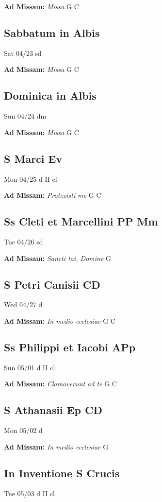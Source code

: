 \documentclass[letterpaper, 10pt, twocolumn]{article}
\begin{document}
\textbf{Ad Missam:} \textit{Missa} G C 

\subsection*{Sabbatum in Albis}Sat 04/23 sd

\textbf{Ad Missam:} \textit{Missa} G C 

\subsection*{Dominica in Albis}Sun 04/24 dm

\textbf{Ad Missam:} \textit{Missa} G C 

\subsection*{S Marci Ev}Mon 04/25 d II cl

\textbf{Ad Missam:} \textit{Protexisti me} G C 

\subsection*{Ss Cleti et Marcellini PP Mm}Tue 04/26 sd

\textbf{Ad Missam:} \textit{Sancti tai, Domine} G 

\subsection*{S Petri Canisii CD}Wed 04/27 d

\textbf{Ad Missam:} \textit{In medio ecclesiae} G C 

\subsection*{Ss Philippi et Iacobi APp}Sun 05/01 d II cl

\textbf{Ad Missam:} \textit{Clamaverunt ad te} G C 

\subsection*{S Athanasii Ep CD}Mon 05/02 d

\textbf{Ad Missam:} \textit{In medio ecclesiae} G 

\subsection*{In Inventione S Crucis}Tue 05/03 d II cl
\end{document}
